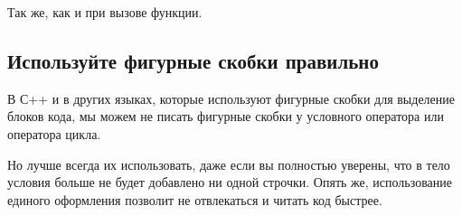 \documentclass[letterpaper,10pt,russian]{sphinxmanual}
\begin{document}
\sphinxAtStartPar
Так же, как и при вызове функции.

\begin{sphinxVerbatim}[commandchars=\\\{\}]
   
                     
\end{sphinxVerbatim}


\subsection{Используйте фигурные скобки правильно}
\label{\detokenize{educational_materials/styles/content:id4}}
\sphinxAtStartPar
В С++ и в других языках, которые используют фигурные скобки для выделение блоков кода, мы можем не писать фигурные скобки у условного оператора или оператора цикла.

\begin{sphinxVerbatim}[commandchars=\\\{\}]
\end{sphinxVerbatim}

\sphinxAtStartPar
Но лучше всегда их использовать, даже если вы полностью уверены, что в тело условия больше не будет добавлено ни одной строчки. Опять же, использование единого оформления позволит не отвлекаться и читать код быстрее.

\begin{sphinxVerbatim}[commandchars=\\\{\}]
\end{sphinxVerbatim}
\end{document}
